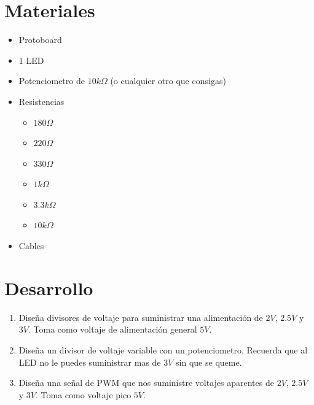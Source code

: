 
\section{Materiales}

	\begin{itemize}
		\item Protoboard
		\item 1 LED
		\item Potenciometro de $10 k \Omega$ (o cualquier otro que consigas)
		\item Resistencias
		\begin{itemize}
			\item $180 \Omega$
			\item $220 \Omega$
			\item $330 \Omega$
			\item $1 k\Omega$
			\item $3.3 k\Omega$
			\item $10 k\Omega$
		\end{itemize}
		\item Cables
	\end{itemize}


\section{Desarrollo}
	
	\begin{enumerate}
		\item Diseña divisores de voltaje para suministrar una alimentación de $2 V$, $2.5 V$ y $3 V$. Toma como voltaje de alimentación general $5 V$.
		\item Diseña un divisor de voltaje variable con un potenciometro. Recuerda que al LED no le puedes suministrar mas de $3 V$ sin que se queme.
		\item Diseña una señal de PWM que nos suministre voltajes aparentes de $2 V$, $2.5 V$ y $3 V$. Toma como voltaje pico $5 V$.
	\end{enumerate}




